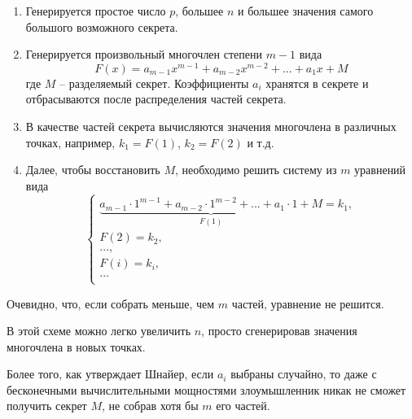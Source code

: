 \begin{enumerate}
	\item Генерируется простое число $p$, большее $n$ и большее значения самого большого возможного секрета.
	\item Генерируется произвольный многочлен степени $m - 1$ вида 
	$$F(x) = a_{m - 1}x^{m - 1} + a_{m - 2}x^{m - 2} + ... + a_1x + M$$
	где $M$ -- разделяемый секрет. Коэффициенты $a_i$ хранятся в секрете и отбрасываются после распределения частей секрета.
	\item В качестве частей секрета вычисляются значения многочлена в различных точках, например, $k_1 = F(1)$, $k_2 = F(2)$ и т.д.
	\item Далее, чтобы восстановить $M$, необходимо решить систему из $m$ уравнений вида
	$$
	\begin{cases}
		\underbrace{a_{m - 1} \cdot 1^{m - 1} + a_{m - 2} \cdot 1^{m - 2} + ... + a_1 \cdot 1 + M}_{F(1)} = k_1, \\
		F(2) = k_2, \\
		..., \\
		F(i) = k_i, \\
		... \\
	\end{cases}
	$$
\end{enumerate}

Очевидно, что, если собрать меньше, чем $m$ частей, уравнение не решится. 

В этой схеме можно легко увеличить $n$, просто сгенерировав значения многочлена в новых точках.

Более того, как утверждает Шнайер, если $a_i$ выбраны случайно, то даже с бесконечными вычислительными мощностями злоумышленник никак не сможет получить секрет $M$, не собрав хотя бы $m$ его частей.   